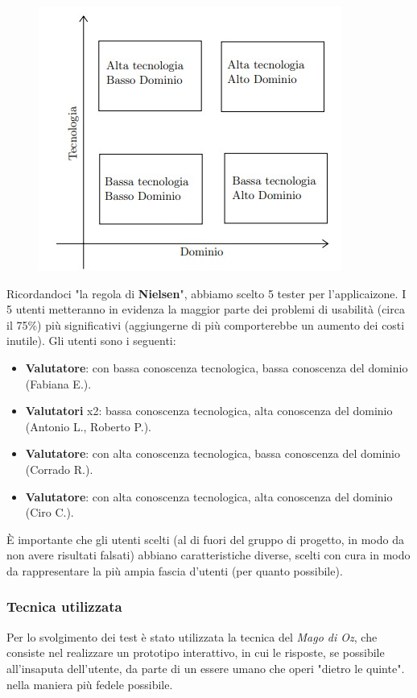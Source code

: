 \begin{figure}[H]
  \centering
  \includegraphics[scale=0.7]{img/varie/valutatori.jpeg}
\end{figure}
Ricordandoci "la regola di \textbf{Nielsen}", abbiamo scelto 5 tester per l'applicaizone. I 5 utenti metteranno in evidenza la maggior parte dei problemi di usabilità (circa il 75\%) più significativi (aggiungerne di più comporterebbe un aumento dei costi inutile). Gli utenti sono i seguenti:
\begin{itemize}
  \item \textbf{Valutatore}: con bassa conoscenza tecnologica, bassa conoscenza del dominio (Fabiana E.).
  \item \textbf{Valutatori} x2: bassa conoscenza tecnologica, alta conoscenza del dominio
        \subitem (Antonio L., Roberto P.).
  \item \textbf{Valutatore}: con alta conoscenza tecnologica, bassa conoscenza del dominio (Corrado R.).
  \item \textbf{Valutatore}: con alta conoscenza tecnologica, alta conoscenza del dominio (Ciro C.).
\end{itemize}
\`{E} importante che gli utenti scelti (al di fuori del gruppo di progetto, in modo da non avere risultati falsati) abbiano caratteristiche diverse, scelti con cura in modo da rappresentare la più ampia fascia d'utenti (per quanto possibile).
\newpage
\subsubsection{Tecnica utilizzata}
Per lo svolgimento dei test è stato utilizzata la tecnica del \textit{Mago di Oz}, che consiste nel realizzare un prototipo interattivo, in cui le risposte, se possibile all'insaputa dell'utente, da parte di un essere umano che operi "dietro le quinte". nella maniera più fedele possibile.
